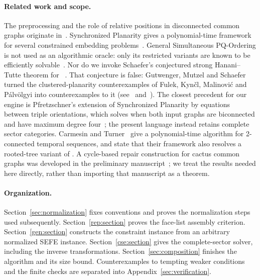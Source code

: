 \paragraph{Related work and scope.}
The preprocessing and the role of relative positions in disconnected
common graphs originate in~\cite{brdisconnect,bkr}.  Synchronized
Planarity gives a polynomial-time framework for several constrained
embedding problems~\cite{bfr}.  General Simultaneous PQ-Ordering is not
used as an algorithmic oracle: only its restricted variants are known to
be efficiently solvable~\cite{pqordering}.  Nor do we invoke Schaefer's
conjectured strong Hanani--Tutte theorem for
\SEFE{}~\cite[Conjecture~6.20]{schaefer}.  That conjecture is false:
Gutwenger, Mutzel and Schaefer~\cite{gms2014} turned the clustered-planarity
counterexamples of Fulek, Kyn\v{c}l, Malinovi\'c and P\'alv\"olgyi into
counterexamples to it (see~\cite[p.~6]{fkmp2015}
and~\cite[p.~137]{fps2017}).  The closest precedent for our engine is
Pfretzschner's extension of Synchronized Planarity by equations between
triple orientations, which solves \SEFE{} when both input graphs are
biconnected and have maximum degree four~\cite[Chapter~8]{pfretzschner};
the present language instead retains complete sector categories.
Carmesin and Turner~\cite{temporal} give a polynomial-time algorithm for
2-connected temporal sequences, and state that their framework also
resolves a rooted-tree variant of \SEFE{}.
A cycle-based repair construction for cactus
common graphs was developed in the preliminary manuscript~\cite{cactus};
we treat the results needed here directly, rather than importing that
manuscript as a theorem.

\paragraph{Organization.}
Section~\ref{sec:normalization} fixes conventions and proves the
normalization steps used subsequently.
Section~\ref{rep:section} proves the face-list assembly criterion.
Section~\ref{gen:section} constructs the constraint instance from an
arbitrary normalized SEFE instance.
Section~\ref{cse:section} gives the complete-sector solver, including the
inverse transformations.
Section~\ref{sec:composition} finishes the algorithm and its size bound.
Counterexamples to tempting weaker conditions and the finite checks are
separated into Appendix~\ref{sec:verification}.
